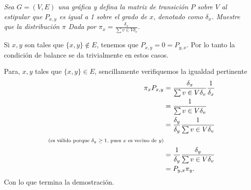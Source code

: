 \emph{
    Sea $G=(V,E)$ una gráfica y defina la matriz de transición $P$ sobre $V$ al estipular que
    $P_{x,y}$ es igual a 1 sobre el grado de $x$, denotado como $\delta_x$. Muestre que la distribución $\pi$
    Dada por $\pi_x = \frac{\delta_x}{\sum{v \in V} \delta_v}$.
}

Si $x,y$ son tales que $\{x,y\} \not\in E$, tenemos que $P_{x,y} = 0 = P_{y,x}$. Por lo tanto
la condición de balance se da trivialmente en estos casos.\pn

Para, $x,y$ tales que $\{x, y\} \in E$, sencillamente verifiquemos la igualdad pertinente
\begin{align}
        \pi_x P_{x,y}   &=  \frac{\delta_x}{\sum{v \in V} \delta_v} \frac{1}{\delta_x}          \\
                        &=  \frac{1}{\sum{v \in V} \delta_v}                                    \\
                        &=  \frac{\delta_y}{\delta_y} \frac{1}{\sum{v \in V} \delta_v}          \\
                        \;\;\;\;\mbox{{\scriptsize(es válido porque $\delta_y \geq 1$, pues $x$ es vecino de $y$)}} \\
                        &=  \frac{1}{\delta_y} \frac{\delta_y}{\sum{v \in V} \delta_v}          \\
                        &=  P_{y,x} \pi_y.
\end{align}
Con lo que termina la demostración.